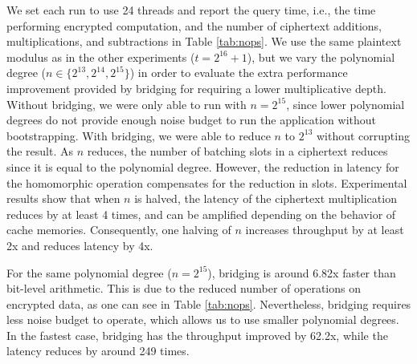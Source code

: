 We set each run to use 24 threads and report the query time, i.e., the time performing encrypted computation, and the number of ciphertext additions, multiplications, and subtractions in Table \ref{tab:nops}. We use the same plaintext modulus as in the other experiments ($t = 2^{16}+1$), but we vary the polynomial degree ($n \in \{2^{13}, 2^{14}, 2^{15}\}$) in order to evaluate the extra performance improvement provided by bridging for requiring a lower multiplicative depth.
Without bridging, we were only able to run with $n = 2^{15}$, since lower polynomial degrees do not provide enough noise budget to run the application without bootstrapping. %
With bridging, we were able to reduce $n$ to $2^{13}$ without corrupting the result.
As $n$ reduces, the number of batching slots in a ciphertext reduces since it is equal to the polynomial degree. However, the reduction in latency for the homomorphic operation compensates for the reduction in slots. Experimental results show that when $n$ is halved, the latency of the ciphertext multiplication reduces by at least 4 times, and can be amplified depending on the behavior of cache memories. \iffalse This effect can be even greater due to effects related to cache memories.  Therefore, reducing the polynomial degree is always desirable.\fi Consequently, one halving of $n$ increases throughput by at least 2x and reduces latency by 4x.

For the same polynomial degree ($n = 2^{15}$), bridging is around 6.82x faster than bit-level arithmetic. This is due to the reduced number of operations on encrypted data, as one can see in Table \ref{tab:nops}.
Nevertheless, bridging requires less noise budget to operate, which allows us to use smaller polynomial degrees. In the fastest case, bridging has the throughput improved by 62.2x, while the latency reduces by around 249 times.
\vspace{-0.1cm}


